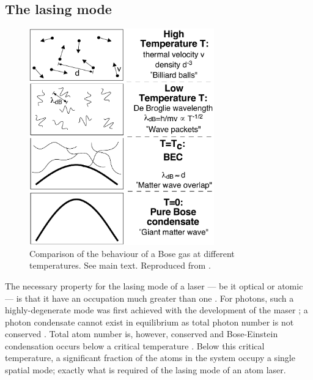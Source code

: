 \subsection{The lasing mode}

\begin{figure}
    \centering
    \includegraphics[width=8cm]{WhatIsBEC}
    \caption{
        \label{Introduction:WhatIsBEC}
        Comparison of the behaviour of a Bose gas at different temperatures.  See main text.  Reproduced from \citet{Ketterle:1999fk}.
    }
\end{figure}

The necessary property for the lasing mode of a laser --- be it optical or atomic --- is that it have an occupation much greater than one \citep{Wiseman:1997ba}.  For photons, such a highly-degenerate mode was first achieved with the development of the maser \citep{Gordon:1955}; a photon condensate cannot exist in equilibrium as total photon number is not conserved \citep{Muller:1986,Ketterle:1999fk}.  Total atom number is, however, conserved and Bose-Einstein condensation occurs below a critical temperature \citep{PethickSmith}.  Below this critical temperature, a significant fraction of the atoms in the system occupy a single spatial mode; exactly what is required of the lasing mode of an atom laser.

